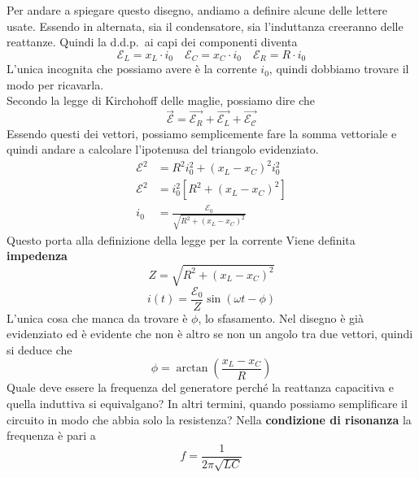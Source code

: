 Per andare a spiegare questo disegno, andiamo a definire alcune delle lettere usate. Essendo in
alternata, sia il condensatore, sia l'induttanza creeranno delle reattanze. Quindi la d.d.p.\ ai
capi dei componenti diventa 
\begin{equation*}
  \mathcal{E}_L = x_L\cdot i_0 \quad \mathcal{E}_C = x_C\cdot i_0 \quad \mathcal{E}_R = R\cdot i_0
\end{equation*}
L'unica incognita che possiamo avere è la corrente $i_0$, quindi dobbiamo trovare il modo per
ricavarla.\\
Secondo la legge di Kirchohoff delle maglie, possiamo dire che
\begin{equation*}
  \vec{\mathcal{E}} = \vec{\mathcal{E}_R} + \vec{\mathcal{E}_L} + \vec{\mathcal{E_C}}
\end{equation*}
Essendo questi dei vettori, possiamo semplicemente fare la somma
vettoriale e quindi andare a calcolare l'ipotenusa del triangolo evidenziato.
\begin{align*}
  \mathcal{E}^2 &= R^2i_0^2+(x_L-x_C)^2i_0^2\\
  \mathcal{E}^2 &= i_0^2[R^2+(x_L-x_C)^2]\\
  i_0 &= \frac{\mathcal{E}_0}{\sqrt{R^2+(x_L-x_C)^2}}
\end{align*}
Questo porta alla definizione della legge per la corrente
Viene definita \textbf{impedenza}
\begin{equation*}
  Z = \sqrt{R^2+(x_L-x_C)^2} 
\end{equation*}
\begin{equation*}
  i(t) = \frac{\mathcal{E}_0}{Z}\sin \left( \omega t-\phi \right)
\end{equation*}
L'unica cosa che manca da trovare è $\phi$, lo sfasamento. Nel disegno è già evidenziato ed è
evidente che non è altro se non un angolo tra due vettori, quindi si deduce che
\begin{equation*}
  \phi = \arctan \left( \frac{x_L-x_C}{R} \right)
\end{equation*}
Quale deve essere la frequenza del generatore perché la reattanza 
capacitiva e quella induttiva si equivalgano? In altri termini, quando possiamo semplificare
il circuito in modo che abbia solo la resistenza? Nella \textbf{condizione di risonanza}
la frequenza è pari a
\begin{equation*}
  f = \frac{1}{2\pi\sqrt{LC}}
\end{equation*}

